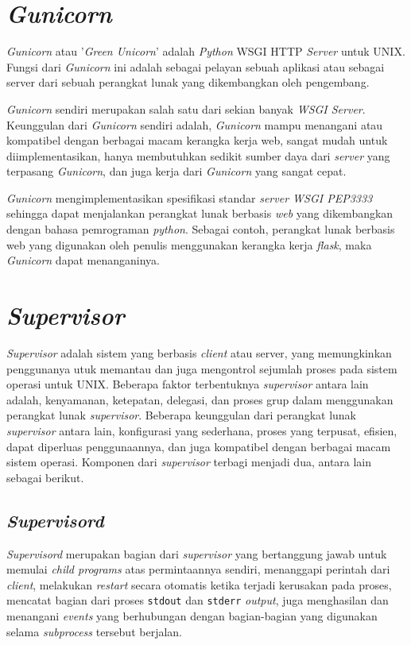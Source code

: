  \section{\textit{Gunicorn}}
 \textit{Gunicorn} atau '\textit{Green Unicorn}' adalah \textit{Python} WSGI HTTP \textit{Server} untuk UNIX. Fungsi dari \textit{Gunicorn} ini adalah sebagai pelayan sebuah aplikasi atau sebagai server dari sebuah perangkat lunak yang dikembangkan oleh pengembang.
 
 \textit{Gunicorn} sendiri merupakan salah satu dari sekian banyak \textit{WSGI Server}. Keunggulan dari \textit{Gunicorn} sendiri adalah, \textit{Gunicorn} mampu menangani atau kompatibel dengan berbagai macam kerangka kerja web, sangat mudah untuk diimplementasikan, hanya membutuhkan sedikit sumber daya dari \textit{server} yang terpasang \textit{Gunicorn}, dan juga kerja dari \textit{Gunicorn} yang sangat cepat.
 
 \textit{Gunicorn} mengimplementasikan spesifikasi standar \textit{server WSGI PEP3333} sehingga dapat menjalankan perangkat lunak berbasis \textit{web} yang dikembangkan dengan bahasa pemrograman \textit{python}. Sebagai contoh, perangkat lunak berbasis web yang digunakan oleh penulis menggunakan kerangka kerja \textit{flask}, maka \textit{Gunicorn} dapat menanganinya.
 
 \section{\textit{Supervisor}}
 \textit{Supervisor} adalah sistem yang berbasis \textit{client} atau server, yang memungkinkan penggunanya utuk memantau dan juga mengontrol sejumlah proses pada sistem operasi untuk UNIX. Beberapa faktor terbentuknya \textit{supervisor} antara lain adalah, kenyamanan, ketepatan, delegasi, dan proses grup dalam menggunakan perangkat lunak \textit{supervisor}. Beberapa keunggulan dari perangkat lunak \textit{supervisor} antara lain, konfigurasi yang sederhana, proses yang terpusat, efisien, dapat diperluas penggunaannya, dan juga kompatibel dengan berbagai macam sistem operasi. Komponen dari \textit{supervisor} terbagi menjadi dua, antara lain sebagai berikut.
 
 \subsection{\textit{Supervisord}}
 \textit{Supervisord} merupakan bagian dari \textit{supervisor} yang bertanggung jawab untuk memulai \textit{child programs} atas permintaannya sendiri, menanggapi perintah dari \textit{client}, melakukan \textit{restart} secara otomatis ketika terjadi kerusakan pada proses, mencatat bagian dari proses \texttt{stdout} dan \texttt{stderr} \textit{output}, juga menghasilan dan menangani \textit{events} yang berhubungan dengan bagian-bagian yang digunakan selama \textit{subprocess} tersebut berjalan.
 
